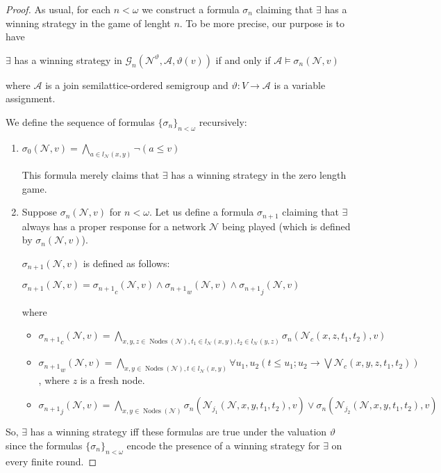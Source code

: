 \documentclass[a4paper]{article}
\theoremstyle{definition}
\theoremstyle{theorem}
\theoremstyle{proposition}
\theoremstyle{lemma}
\theoremstyle{ex}
\theoremstyle{corollary}
\theoremstyle{claim}
\begin{document}
\begin{proof}
  As usual, for each $n < \omega$ we construct a formula $\sigma_n$ claiming that $\exists$ has a winning strategy in the game of lenght $n$. To be more precise, our purpose is to have
  \begin{center}
    $\exists$ has a winning strategy in $\mathcal{G}_n(\mathcal{N}^{\vartheta}, \mathcal{A}, \vartheta(v))$ if and only if $\mathcal{A} \models \sigma_{n}(\mathcal{N}, v)$
  \end{center}
  where $\mathcal{A}$ is a join semilattice-ordered semigroup and $\vartheta : V \to \mathcal{A}$ is a variable assignment.

  We define the sequence of formulas $\{ \sigma_n \}_{n < \omega}$ recursively:
  \begin{enumerate}
    \item $\sigma_0(\mathcal{N}, v) = \bigwedge \limits_{a \in l_{\mathcal{N}}(x, y)} \neg (a \leq v)$

This formula merely claims that $\exists$ has a winning strategy in the zero length game.

    \item Suppose $\sigma_{n}(\mathcal{N}, v)$ for $n < \omega$. Let us define a formula $\sigma_{n + 1}$ claiming that $\exists$ always has a proper response for a network $\mathcal{N}$ being played (which is defined by $\sigma_{n}(\mathcal{N}, v)$).

    $\sigma_{n + 1}(\mathcal{N}, v)$ is defined as follows:
    \begin{center}
      $\sigma_{n + 1}(\mathcal{N}, v) = {\sigma_{n + 1}}_c(\mathcal{N}, v) \land {\sigma_{n + 1}}_w(\mathcal{N}, v) \land {\sigma_{n + 1}}_j(\mathcal{N}, v)$
    \end{center}
    where
    \begin{itemize}
      \item ${\sigma_{n + 1}}_c(\mathcal{N}, v) = \bigwedge \limits_{x, y, z \in \operatorname{Nodes}(\mathcal{N}), t_1 \in l_{\mathcal{N}}(x, y), t_2 \in l_{\mathcal{N}}(y, z)} \sigma_{n}(\mathcal{N}_c(x, z, t_1, t_2), v)$
      \item ${\sigma_{n + 1}}_w(\mathcal{N}, v) = \bigwedge \limits_{x,y \in \operatorname{Nodes}(\mathcal{N}), t \in l_{\mathcal{N}}(x,y)} \forall u_1, u_2 (t \leq u_1 ; u_2 \rightarrow \bigvee \mathcal{N}_c(x,y,z, t_1, t_2))$, where $z$ is a fresh node.
      \item ${\sigma_{n + 1}}_j(\mathcal{N}, v) = \bigwedge \limits_{x, y \in \operatorname{Nodes}(\mathcal{N})} \sigma_{n}(\mathcal{N}_{j_1}(\mathcal{N}, x, y, t_1, t_2), v) \lor \sigma_{n}(\mathcal{N}_{j_2}(\mathcal{N}, x, y, t_1, t_2), v)$
    \end{itemize}
  \end{enumerate}

  So, $\exists$ has a winning strategy iff these formulas are true under the valuation $\vartheta$ since the formulas $\{ \sigma_n \}_{n < \omega}$ encode the presence of a winning strategy for $\exists$ on every finite round.
\end{proof}
\end{document}
